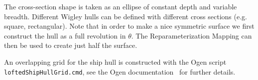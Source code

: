 The cross-section shape is taken as an ellipse of constant depth and variable breadth. Different Wigley
hulls can be defined with different cross sections (e.g. square, rectangular).
Note that in order to make a nice symmetric surface we first construct the hull as a full revolution in $\theta$. 
The Reparameterization Mapping can then be used to create just half the surface.

An overlapping grid for the ship hull is constructed with the Ogen script {\tt loftedShipHullGrid.cmd}, 
see the Ogen documentation~\cite{OGEN} for further details.
